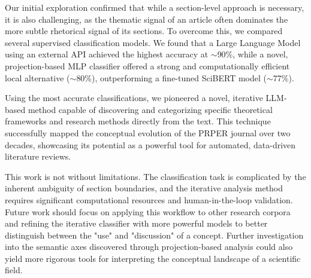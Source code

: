 \documentclass[12pt]{article}
\begin{document}
Our initial exploration confirmed that while a section-level approach is necessary, it is also challenging, as the thematic signal of an article often dominates the more subtle rhetorical signal of its sections. To overcome this, we compared several supervised classification models. We found that a Large Language Model using an external API achieved the highest accuracy at $\sim$90\%, while a novel, projection-based MLP classifier offered a strong and computationally efficient local alternative ($\sim$80\%), outperforming a fine-tuned SciBERT model ($\sim$77\%).

Using the most accurate classifications, we pioneered a novel, iterative LLM-based method capable of discovering and categorizing specific theoretical frameworks and research methods directly from the text. This technique successfully mapped the conceptual evolution of the PRPER journal over two decades, showcasing its potential as a powerful tool for automated, data-driven literature reviews.

This work is not without limitations. The classification task is complicated by the inherent ambiguity of section boundaries, and the iterative analysis method requires significant computational resources and human-in-the-loop validation. Future work should focus on applying this workflow to other research corpora and refining the iterative classifier with more powerful models to better distinguish between the "use" and "discussion" of a concept. Further investigation into the semantic axes discovered through projection-based analysis could also yield more rigorous tools for interpreting the conceptual landscape of a scientific field.

\printbibliography[title={Bibliography}]
\end{document}
